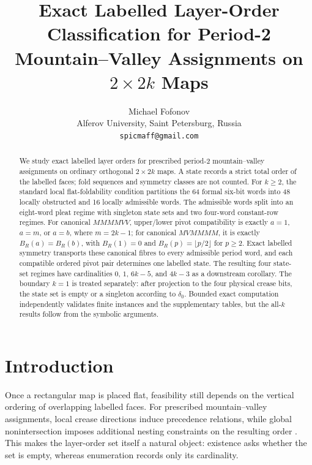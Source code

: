 \documentclass[11pt]{article}
\theoremstyle{definition}
\theoremstyle{remark}
\begin{document}
\title{Exact Labelled Layer-Order Classification for Period-2 Mountain--Valley Assignments on $2\times 2k$ Maps}
\author{Michael Fofonov\\
Alferov University, Saint Petersburg, Russia\\
\texttt{spicmaff@gmail.com}}
\date{}
\maketitle

\begin{abstract}
We study exact labelled layer orders for prescribed period-2 mountain--valley assignments on ordinary orthogonal $2\times 2k$ maps. A state records a strict total order of the labelled faces; fold sequences and symmetry classes are not counted. For $k\ge2$, the standard local flat-foldability condition partitions the 64 formal six-bit words into 48 locally obstructed and 16 locally admissible words. The admissible words split into an eight-word pleat regime with singleton state sets and two four-word constant-row regimes. For canonical $MMMMVV$, upper/lower pivot compatibility is exactly $a=1$, $a=m$, or $a=b$, where $m=2k-1$; for canonical $MVMMMM$, it is exactly $B_R(a)=B_R(b)$, with $B_R(1)=0$ and $B_R(p)=\lfloor p/2\rfloor$ for $p\ge2$. Exact labelled symmetry transports these canonical fibres to every admissible period word, and each compatible ordered pivot pair determines one labelled state. The resulting four state-set regimes have cardinalities $0$, $1$, $6k-5$, and $4k-3$ as a downstream corollary. The boundary $k=1$ is treated separately: after projection to the four physical crease bits, the state set is empty or a singleton according to $\delta_0$. Bounded exact computation independently validates finite instances and the supplementary tables, but the all-$k$ results follow from the symbolic arguments.
\end{abstract}

\section{Introduction}
Once a rectangular map is placed flat, feasibility still depends on the vertical ordering of overlapping labelled faces. For prescribed mountain--valley assignments, local crease directions induce precedence relations, while global nonintersection imposes additional nesting constraints on the resulting order \cite{Nishat2013,NishatWhitesides2013}. This makes the layer-order set itself a natural object: existence asks whether the set is empty, whereas enumeration records only its cardinality.
\end{document}
